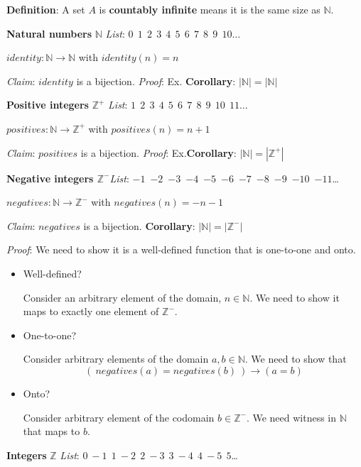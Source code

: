 \documentclass[12pt, oneside]{article}
\begin{document}
{\bf Definition}: A set $A$ is {\bf countably infinite} means it is the 
same size as $\mathbb{N}$.

 

{\bf Natural numbers} $\mathbb{N}$ \hfill {\it List}:  $0~~1~~2~~3~~4~~5~~6~~7~~8~~9~~10 \ldots$

$identity: \mathbb{N} \to \mathbb{N}$ with $identity(n) = n$

{\it Claim}: $identity$ is a bijection. {\it Proof}: Ex. \hfill {\bf Corollary}: $ | \mathbb{N} | = |\mathbb{N}|~$

{\bf Positive integers} $\mathbb{Z}^+$ \hfill {\it List}:  $1~~2~~3~~4~~5~~6~~7~~8~~9~~10~~11\ldots$

$positives: \mathbb{N} \to \mathbb{Z}^+$ with $positives(n) = n+1$

{\it Claim}: $positives$ is a bijection.  {\it Proof}: Ex.\hfill {\bf Corollary}: $ | \mathbb{N} | = |\mathbb{Z}^+|$

{\bf Negative integers $\mathbb{Z}^-$}\hfill  {\it List}: $-1$~$-2$~$-3$~$-4$~$-5$~$-6$~$-7$~$-8$~$-9$~$-10$~$-11$\ldots

$negatives: \mathbb{N} \to \mathbb{Z}^-$ with $negatives(n) = -n-1$

{\it Claim}: $negatives$ is a bijection. \hfill {\bf Corollary}: $ | \mathbb{N} | = |\mathbb{Z}^-|$

{\it Proof}: We need to show it is a well-defined function that is one-to-one and onto.

\begin{itemize}
\item Well-defined? 

Consider an arbitrary element of the domain, $n \in \mathbb{N}$. We need to show it maps to exactly one element of $\mathbb{Z}^-$.

\vfill

\item One-to-one?


Consider arbitrary elements of the domain $a, b \in \mathbb{N}$. We need to show that 
$$\left(~negatives(a) = negatives(b) ~\right) \to (a=b)$$

\vfill

\item Onto?

Consider arbitrary element of the codomain $b \in \mathbb{Z}^-$. We need witness in $\mathbb{N}$ that maps to $b$.

\vfill
\end{itemize}

{\bf Integers} $\mathbb{Z}$ \hfill {\it List}:  $0~-1~~1~-2~~2~-3~~3~-4~~4~-5~~5$\ldots
\end{document}
